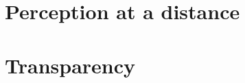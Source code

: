 \documentclass[12pt]{article}
\begin{document}

\section{Perception at a distance} %
\label{sec:perception_at_a_distance}




\section{Transparency} %
\label{sec:transparency}


 
 
\end{document}
